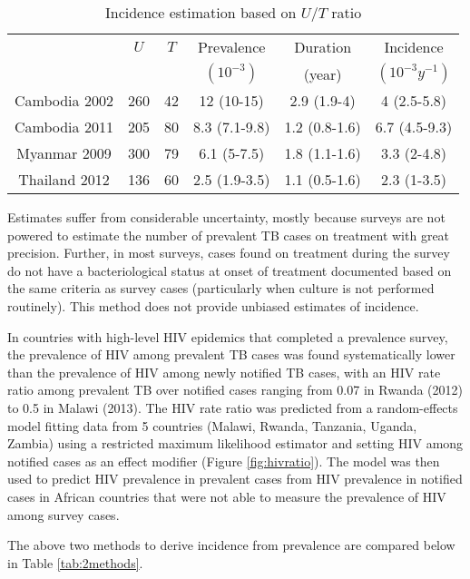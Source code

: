 \begin{table} 
\label{tab:method2}
    \begin{tabular}{ c c c c c c }
    \hline
         & $U$ & $T$ & Prevalence & Duration & Incidence \\ 
         &     &     & $(10^{-3})$ & (year)    & $(10^{-3}y^{-1})$ \\
     \hline
        Cambodia 2002 & 260 & 42 & 12 (10-15) & 2.9 (1.9-4) & 4 (2.5-5.8) \\ 
        Cambodia 2011 & 205 & 80 & 8.3 (7.1-9.8) & 1.2 (0.8-1.6) & 6.7 (4.5-9.3) \\ 
        Myanmar 2009 & 300 & 79 & 6.1 (5-7.5) & 1.8 (1.1-1.6) & 3.3 (2-4.8) \\ 
        Thailand 2012 & 136 & 60 & 2.5 (1.9-3.5) & 1.1 (0.5-1.6) & 2.3 (1-3.5) \\ 
    \hline
    \end{tabular} 
    \caption{Incidence estimation based on $U/T$ ratio
} 
\end{table}

Estimates suffer from considerable uncertainty, mostly because surveys are not powered to estimate the number of prevalent TB cases on treatment with great precision. Further, in most surveys, cases found on treatment during the survey do not have a bacteriological status at onset of treatment documented based on the same criteria as survey cases (particularly when culture is not performed routinely). This method does not provide unbiased estimates of incidence. 

In countries with high-level HIV epidemics that completed a prevalence survey, the prevalence of HIV among prevalent TB cases was found systematically lower than the prevalence of HIV among newly notified TB cases, with an HIV rate ratio among prevalent TB over notified cases ranging from 0.07 in Rwanda (2012) to 0.5 in Malawi (2013). The HIV rate ratio was predicted from a random-effects model fitting data from 5 countries (Malawi, Rwanda, Tanzania, Uganda, Zambia) using a restricted maximum likelihood estimator and setting HIV among notified cases as an effect modifier (Figure \ref{fig:hivratio}). The model was then used to predict HIV prevalence in prevalent cases from HIV prevalence in notified cases in African countries that were not able to measure the prevalence of HIV among survey cases.

The above two methods to derive incidence from prevalence are compared below in Table \ref{tab:2methods}.

